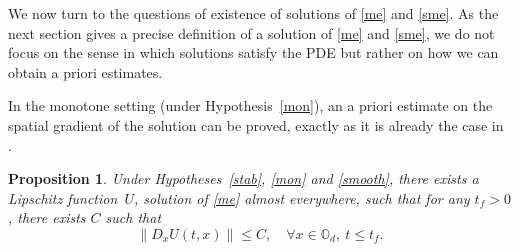 \documentclass[JEP,XML,SOM,Unicode,NoEqCountersInSection,published]{cedram}
\newtheorem{Prop}{Proposition}[section]
\theoremstyle{definition}
\begin{document}
We now turn to the questions of existence of solutions of \eqref{me} and \eqref{sme}. As the next section gives a precise definition of a solution of \eqref{me} and \eqref{sme}, we do not focus on the sense in which solutions satisfy the PDE but rather on how we can obtain a priori estimates.

In the monotone setting (\ie under Hypothesis~\ref{mon}), an a priori estimate on the spatial gradient of the solution can be proved, exactly as it is already the case in \cite{lions2007cours}.
\begin{Prop}\label{existme}
Under Hypotheses~\ref{stab}, \ref{mon} and \ref{smooth}, there exists a Lipschitz function~$U$, solution of \eqref{me} almost everywhere, such that for any $t_f > 0$, there exists $C$ such that%
\begin{equation*}
\|D_x U(t,x)\| \leq C, \quad\forall x \in \mathbb{O}_d,\ t \leq t_f.
\end{equation*}
\end{Prop}
\end{document}
